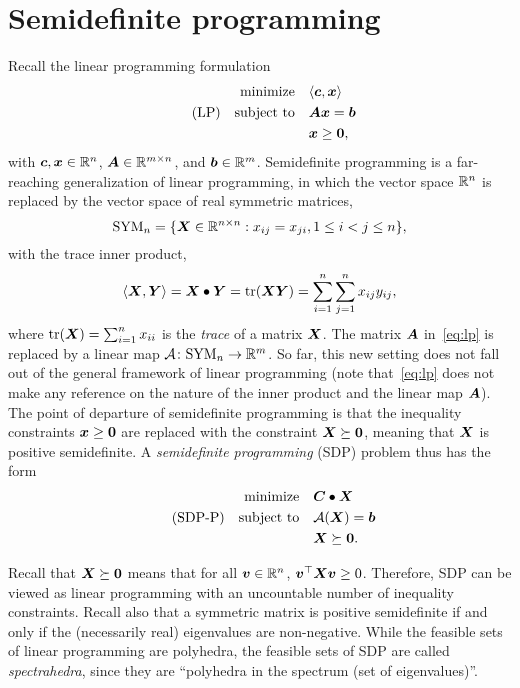 \section{Semidefinite programming}
Recall the linear programming formulation
\begin{align}\label{eq:lp}\tag{LP}
\begin{split}
 \text{minimize}\quad & \langle {\bm{c}}, {\bm{x}} \rangle\\
 \quad\text{subject to}\quad & \bm{A}\bm{x}=\bm{b}\\
 & \bm{x}\geq \bm{0},
 \end{split}
\end{align}
with $\bm{c},\bm{x}\in \mathbb{R}^n$, $\bm{A}\in \mathbb{R}^{m\times n}$, and $\bm{b}\in \mathbb{R}^m$. 
Semidefinite programming is a far-reaching generalization of linear programming, in which the vector space $\mathbb{R}^n$ is replaced by the vector space of real symmetric matrices,
\begin{equation*}
 \mathrm{SYM}_n = \{\bm{X}\in \mathbb{R}^{n\times n} \mathrel{\mathop{:}} x_{ij}=x_{ji}, 1\leq i<j\leq n\},
\end{equation*}
with the trace inner product,
\begin{equation*}
 \langle {\bm{X}}, {\bm{Y}} \rangle = \bm{X}\bullet\bm{Y} = \mathrm{tr}(\bm{X}\bm{Y}) = \sum_{i=1}^n \sum_{j=1}^n x_{ij}y_{ij},
\end{equation*}
where $\mathrm{tr}(\bm{X})=\sum_{i=1}^n x_{ii}$ is the {\em trace} of a matrix $\bm{X}$. 
The matrix $\bm{A}$ in~\eqref{eq:lp} is replaced by a linear map $\mathcal{\bm{A}}\colon \mathrm{SYM}_n\to \mathbb{R}^m$. So far, this new setting does not fall out of the general framework of linear programming (note that~\eqref{eq:lp} does not make any reference on the nature of the inner product and the linear map $\bm{A}$). The point of departure of semidefinite programming is that the inequality constraints $\bm{x}\geq \bm{0}$ are replaced with the constraint $\bm{X} \succeq\bm{0}$, meaning that $\bm{X}$ is positive semidefinite. A {\em semidefinite programming} (SDP) problem thus has the form
\begin{align}\label{eq:sdp-p}\tag{SDP-P}
\begin{split}
 \text{minimize}\quad & \bm{C}\bullet \bm{X}\\
 \quad\text{subject to}\quad & \mathcal{\bm{A}}(\bm{X})=\bm{b}\\
 & \bm{X} \succeq \bm{0}.
 \end{split}
\end{align}

\begin{remark}\label{re:1}
 Recall that $\bm{X}\succeq \bm{0}$ means that for all $\bm{v}\in \mathbb{R}^n$, $\bm{v}^{\top}\bm{X}\bm{v}\geq 0$. Therefore, SDP can be viewed as linear programming with an uncountable number of inequality constraints. Recall also that a symmetric matrix is positive semidefinite if and only if the (necessarily real) eigenvalues are non-negative. While the feasible sets of linear programming are polyhedra, the feasible sets of SDP are called {\em spectrahedra}, since they are ``polyhedra in the spectrum (set of eigenvalues)''.
\end{remark}

